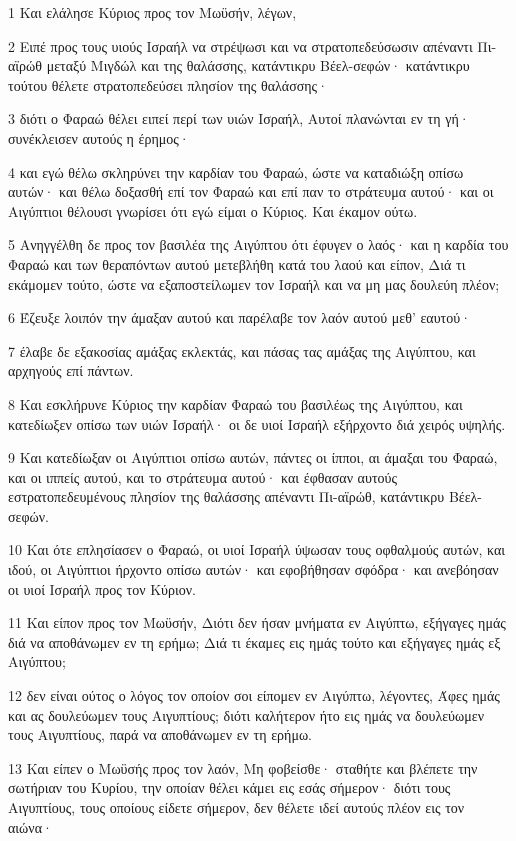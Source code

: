 \par 1 Και ελάλησε Κύριος προς τον Μωϋσήν, λέγων,
\par 2 Ειπέ προς τους υιούς Ισραήλ να στρέψωσι και να στρατοπεδεύσωσιν απέναντι Πι-αϊρώθ μεταξύ Μιγδώλ και της θαλάσσης, κατάντικρυ Βέελ-σεφών· κατάντικρυ τούτου θέλετε στρατοπεδεύσει πλησίον της θαλάσσης·
\par 3 διότι ο Φαραώ θέλει ειπεί περί των υιών Ισραήλ, Αυτοί πλανώνται εν τη γή· συνέκλεισεν αυτούς η έρημος·
\par 4 και εγώ θέλω σκληρύνει την καρδίαν του Φαραώ, ώστε να καταδιώξη οπίσω αυτών· και θέλω δοξασθή επί τον Φαραώ και επί παν το στράτευμα αυτού· και οι Αιγύπτιοι θέλουσι γνωρίσει ότι εγώ είμαι ο Κύριος. Και έκαμον ούτω.
\par 5 Ανηγγέλθη δε προς τον βασιλέα της Αιγύπτου ότι έφυγεν ο λαός· και η καρδία του Φαραώ και των θεραπόντων αυτού μετεβλήθη κατά του λαού και είπον, Διά τι εκάμομεν τούτο, ώστε να εξαποστείλωμεν τον Ισραήλ και να μη μας δουλεύη πλέον;
\par 6 Έζευξε λοιπόν την άμαξαν αυτού και παρέλαβε τον λαόν αυτού μεθ' εαυτού·
\par 7 έλαβε δε εξακοσίας αμάξας εκλεκτάς, και πάσας τας αμάξας της Αιγύπτου, και αρχηγούς επί πάντων.
\par 8 Και εσκλήρυνε Κύριος την καρδίαν Φαραώ του βασιλέως της Αιγύπτου, και κατεδίωξεν οπίσω των υιών Ισραήλ· οι δε υιοί Ισραήλ εξήρχοντο διά χειρός υψηλής.
\par 9 Και κατεδίωξαν οι Αιγύπτιοι οπίσω αυτών, πάντες οι ίπποι, αι άμαξαι του Φαραώ, και οι ιππείς αυτού, και το στράτευμα αυτού· και έφθασαν αυτούς εστρατοπεδευμένους πλησίον της θαλάσσης απέναντι Πι-αϊρώθ, κατάντικρυ Βέελ-σεφών.
\par 10 Και ότε επλησίασεν ο Φαραώ, οι υιοί Ισραήλ ύψωσαν τους οφθαλμούς αυτών, και ιδού, οι Αιγύπτιοι ήρχοντο οπίσω αυτών· και εφοβήθησαν σφόδρα· και ανεβόησαν οι υιοί Ισραήλ προς τον Κύριον.
\par 11 Και είπον προς τον Μωϋσήν, Διότι δεν ήσαν μνήματα εν Αιγύπτω, εξήγαγες ημάς διά να αποθάνωμεν εν τη ερήμω; Διά τι έκαμες εις ημάς τούτο και εξήγαγες ημάς εξ Αιγύπτου;
\par 12 δεν είναι ούτος ο λόγος τον οποίον σοι είπομεν εν Αιγύπτω, λέγοντες, Άφες ημάς και ας δουλεύωμεν τους Αιγυπτίους; διότι καλήτερον ήτο εις ημάς να δουλεύωμεν τους Αιγυπτίους, παρά να αποθάνωμεν εν τη ερήμω.
\par 13 Και είπεν ο Μωϋσής προς τον λαόν, Μη φοβείσθε· σταθήτε και βλέπετε την σωτήριαν του Κυρίου, την οποίαν θέλει κάμει εις εσάς σήμερον· διότι τους Αιγυπτίους, τους οποίους είδετε σήμερον, δεν θέλετε ιδεί αυτούς πλέον εις τον αιώνα·
